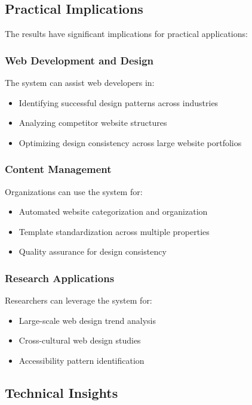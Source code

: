 \subsection{Practical Implications}
\label{subsec:practical-implications}

The results have significant implications for practical applications:

\subsubsection{Web Development and Design}
The system can assist web developers in:
\begin{itemize}
    \item Identifying successful design patterns across industries
    \item Analyzing competitor website structures
    \item Optimizing design consistency across large website portfolios
\end{itemize}

\subsubsection{Content Management}
Organizations can use the system for:
\begin{itemize}
    \item Automated website categorization and organization
    \item Template standardization across multiple properties
    \item Quality assurance for design consistency
\end{itemize}

\subsubsection{Research Applications}
Researchers can leverage the system for:
\begin{itemize}
    \item Large-scale web design trend analysis
    \item Cross-cultural web design studies
    \item Accessibility pattern identification
\end{itemize}

\subsection{Technical Insights}
\label{subsec:technical-insights}

